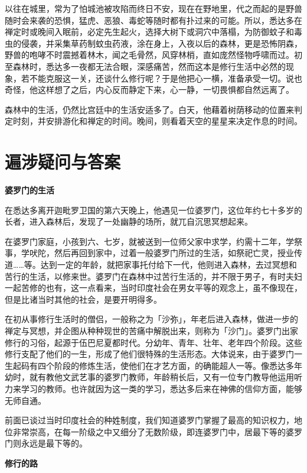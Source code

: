 \documentclass[12pt,twoside,openany]{book}
\newcommand{\mt}[1]{\textbullet \textbf{#1}}
\begin{document}
以往在城里，常为了怕城池被攻陷而终日不安，现在在野地里，代之而起的是野兽随时会来袭的恐惧，猛虎、恶狼、毒蛇等随时都有扑过来的可能。所以，悉达多在禅定时或晚间入眠前，必定先生起火，选择大树下或洞穴中落榻，为防御蚊子和毒虫的侵袭，并采集草药制蚊虫药液，涂在身上，入夜以后的森林，更是恐怖阴森，野兽的咆哮不时震撼着林木，闻之毛骨然，风穿林梢，直如庞然怪物呼啸而过。初至森林时，悉达多一夜都无法合眼，深感痛苦，然而这本是修行生活中必然的现象，若不能克服这一关，还谈什么修行呢？于是他把心一横，准备承受一切。说也奇怪，他这样想了之后，内心反而静定下来，心一静，一切畏惧都自然远离了。

森林中的生活，仍然比宫廷中的生活安适多了。白天，他藉着树荫移动的位置来判定时刻，并安排游化和禅定的时间。晚间，则看着天空的星星来决定作息的时间。



\section{遍涉疑问与答案}\label{sec1.6}

\mt{婆罗门的生活}

在悉达多离开迦毗罗卫国的第六天晚上，他遇见一位婆罗门，这位年约七十多岁的长者，进入森林后，发现了一处幽静的场所，就兀自沉思冥想起来。

在婆罗门家庭，小孩到六、七岁，就被送到一位师父家中求学，约需十二年，学祭事，学吠陀，然后再回到家中，过着一般婆罗门所过的生活，如祭祀亡灵，授业传道……等。达到一定的年龄，就把家事托付给下一代，他则进入森林，去过冥想和苦行的生活，以修来世。婆罗门在森林中过苦行生活的，并不限于男子，有时夫妇一起苦修的也有，这一点看来，当时印度社会在男女平等的观念上，虽不像现在，但是比诸当时其他的社会，是要开明得多。

在初从事修行生活时的僧侣，一般称之为「沙弥」，年老后进入森林，做进一步的禅定与冥想，并企图从种种现世的苦痛中解脱出来，则称为「沙门」。婆罗门出家修行的习俗，起源于伍巴尼夏都时代。分幼年、青年、壮年、老年四个阶段。这些修行支配了他们的一生，形成了他们很特殊的生活形态。大体说来，由于婆罗门一生起码有四个阶段的修炼生活，使他们在才艺方面，的确能超人一等。像悉达多年幼时，就有教他文武艺事的婆罗门教师，年龄稍长后，又有一位专门教导他运用听力来学习的教师。也许就因为这一类的学习，悉达多后来在神佛的信仰方面，能够无师自通。

前面已谈过当时印度社会的种姓制度，我们知道婆罗门掌握了最高的知识权力，地位非常崇高，在每一阶级之中又细分了无数阶级，即连婆罗门中，居最下等的婆罗门则永远是最下等的。

\mt{修行的路}
\end{document}
